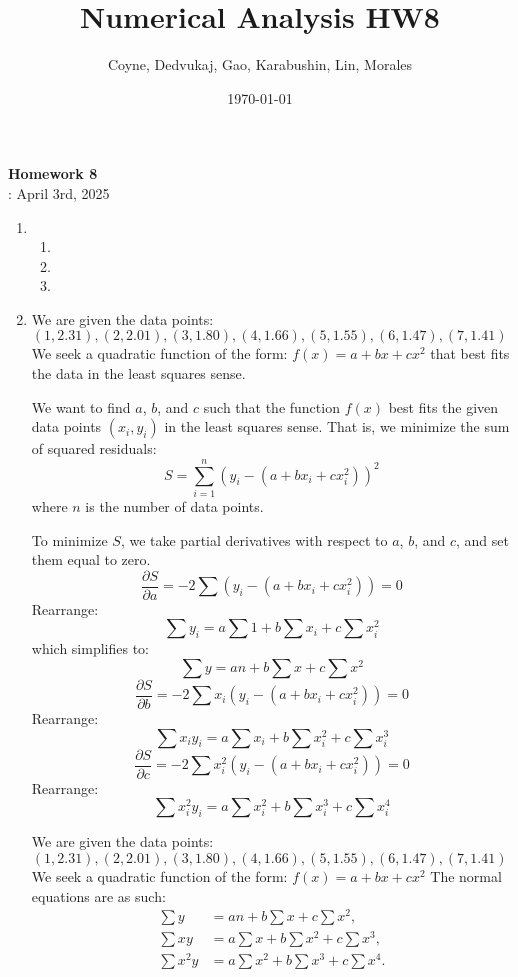 \documentclass[12pt]{article}
\title{Numerical Analysis HW8}
\author{Coyne, Dedvukaj, Gao, Karabushin, Lin, Morales}
\date{\today}
\begin{document}
\pagestyle{fancy}


\begin{center}
\textbf{\Large Homework 8} \\
: April 3rd, 2025
\end{center}

\begin{enumerate}[leftmargin=0em]
  \item
  \begin{enumerate}[leftmargin=!]
    \item

    \item

    \item
  \end{enumerate}

  \item

  We are given the data points:
  \((1, 2.31), (2, 2.01), (3, 1.80), (4, 1.66), (5, 1.55), (6, 1.47), (7, 1.41)\)
  We seek a quadratic function of the form:
  \(f(x) = a + bx + cx^2\)
  that best fits the data in the least squares sense.

  We want to find \(a\), \(b\), and \(c\) such that the function \(f(x)\) best fits the given data points \((x_i, y_i)\) in the least squares sense. That is, we minimize the sum of squared residuals:
  \[S = \sum_{i=1}^{n} (y_i - (a + bx_i + cx_i^2))^2\]
  where \(n\) is the number of data points.
  
  To minimize \(S\), we take partial derivatives with respect to \(a\), \(b\), and \(c\), and set them equal to zero.
  \[\frac{\partial S}{\partial a} = -2 \sum (y_i - (a + bx_i + cx_i^2)) = 0\]
  Rearrange:
  \[\sum y_i = a \sum 1 + b \sum x_i + c \sum x_i^2\]
  which simplifies to:
  \[\sum y = an + b \sum x + c \sum x^2\]
  \[\frac{\partial S}{\partial b} = -2 \sum x_i (y_i - (a + bx_i + cx_i^2)) = 0\]
  Rearrange:
  \[\sum x_i y_i = a \sum x_i + b \sum x_i^2 + c \sum x_i^3\]
  \[\frac{\partial S}{\partial c} = -2 \sum x_i^2 (y_i - (a + bx_i + cx_i^2)) = 0\]
  Rearrange:
  \[\sum x_i^2 y_i = a \sum x_i^2 + b \sum x_i^3 + c \sum x_i^4\]

  We are given the data points:
  \((1, 2.31), (2, 2.01), (3, 1.80), (4, 1.66), (5, 1.55), (6, 1.47), (7, 1.41)\)
  We seek a quadratic function of the form:
  \(f(x) = a + bx + cx^2\)
  The normal equations are as such:
  \begin{align}
  \sum y &= a n + b \sum x + c \sum x^2, \\
  \sum xy &= a \sum x + b \sum x^2 + c \sum x^3, \\
  \sum x^2 y &= a \sum x^2 + b \sum x^3 + c \sum x^4.
  \end{align}
  

\end{enumerate}
\end{document}
